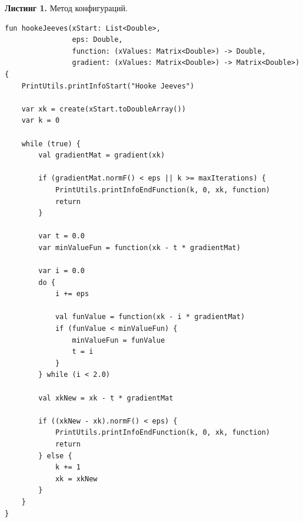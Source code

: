 \documentclass[a4paper, 12pt]{article}   	%
\begin{document}
    \textbf{Листинг 1.} Метод конфигураций.
    \begin{verbatim}
fun hookeJeeves(xStart: List<Double>,
                eps: Double,
                function: (xValues: Matrix<Double>) -> Double,
                gradient: (xValues: Matrix<Double>) -> Matrix<Double>) {
    PrintUtils.printInfoStart("Hooke Jeeves")

    var xk = create(xStart.toDoubleArray())
    var k = 0

    while (true) {
        val gradientMat = gradient(xk)

        if (gradientMat.normF() < eps || k >= maxIterations) {
            PrintUtils.printInfoEndFunction(k, 0, xk, function)
            return
        }

        var t = 0.0
        var minValueFun = function(xk - t * gradientMat)

        var i = 0.0
        do {
            i += eps

            val funValue = function(xk - i * gradientMat)
            if (funValue < minValueFun) {
                minValueFun = funValue
                t = i
            }
        } while (i < 2.0)

        val xkNew = xk - t * gradientMat

        if ((xkNew - xk).normF() < eps) {
            PrintUtils.printInfoEndFunction(k, 0, xk, function)
            return
        } else {
            k += 1
            xk = xkNew
        }
    }
}
    \end{verbatim}
\end{document}
